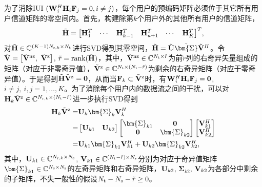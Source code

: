 为了消除IUI ${({{\bf{W}}_i^H{{\bf{H}}_i}{{\bf{F}}_j}} = 0, i \ne j)}$，每个用户的预编码矩阵必须位于其它所有用户信道矩阵的零空间内。首先，构建除第${k}$个用户外的其他所有用户的信道矩阵，
\begin{equation}\label{chap2:eq35}
  {\tilde{{\bf{H}}}} = {{\begin{bmatrix}
                       {{\bf{H}}_1^T} & \cdots & {{\bf{H}}_{k - 1}^T} & {{\bf{H}}_{u + 1}^T} & \cdots & {{\bf{H}}_K^T}
                     \end{bmatrix}}^T},
\end{equation}
对${{\tilde{{\bf{H}}}} \in {\mathbb{C}^{(K - 1){N_{{\rm{r}},k}} \times {N_{\rm{t}}}}}}$进行SVD得到其零空间，${{\tilde{{\bf{H}}}} = {\tilde{{\bf{U}}}}{\tilde{{\bm{\Sigma}}}}{{\tilde{{\bf{V}}}}^H}}$。令${{\tilde{{\bf{V}}}} = \left[{{\tilde{{\bf{V}}}}^{\rm{nz}}},~ {{\tilde{{\bf{V}}}}^{\rm{z}}} \right]}$, ${{\tilde{r}} = {\rm{rank}}({\tilde{{\bf{H}}}})}$，其中，${{{\tilde{{\bf{V}}}}^{\rm{nz}}} \in {\mathbb{C}^{{N_{\rm{t}}} \times {\tilde{r}}}}}$为前${{\tilde{r}}}$列的右奇异矢量组成的矩阵（对应于非零奇异值），${{{\tilde{{\bf{V}}}}^{\rm{z}}} \in {\mathbb{C}^{{N_{\rm{t}}} \times ({N_{\rm{t}}}-{\tilde{r}})}}}$为剩余的右奇异矩阵（对应于零奇异值）。于是得到${{\tilde{{\bf{H}}}}{{\tilde{{\bf{V}}}}^{\rm{z}}} = {\bf{0}}}$，从而当${{{\bf{F}}_k} \subset {{\tilde{{\bf{V}}}}^{\rm{z}}}}$时，有${{{\bf{W}}_i^H{{\bf{H}}_i}{{\bf{F}}_j}} = {\bf{0}}}$, ${i \ne j,~ i,j = 1,\ldots,K}$。为了消除每个用户内的数据流之间的干扰，可以对${{{\bf{H}}_k}{{\tilde{{\bf{V}}}}^{\rm{z}}} \in {\mathbb{C}^{{N_{{\rm{r}},k}} \times \left( {{N_{\rm{t}}} - {\tilde{r}}} \right)}}}$进一步执行SVD得到
\begin{align}\label{chap2:eq36}
  \nonumber {{\bf{H}}_k}{{\tilde{{\bf{V}}}}^{\rm{z}}} = & {{\bf{U}}_k}{{\bm{\Sigma }}_k}{{\bf{V}}_k^H} \\
  \nonumber  = & \begin{bmatrix}
                   {{{\bf{U}}_{k1}}} & {{{\bf{U}}_{k2}}}
                 \end{bmatrix}
                 \begin{bmatrix}
                   {{\bm{\Sigma }}_{k1}} & {\bf{0}} \\
                   {\bf{0}} & {{\bm{\Sigma }}_{k2}}
                 \end{bmatrix}
                 \begin{bmatrix}
                   {{\bf{V}}_{k1}^H} \\
                   {{\bf{V}}_{k2}^H}
                 \end{bmatrix}\\
  = & {{\bf{U}}_{k1}}{{\bm{\Sigma }}_{k1}}{{\bf{V}}_{k1}^H} + {{\bf{U}}_{k2}}{{\bm{\Sigma }}_{k2}}{{\bf{V}}_{k2}^H},
\end{align}
其中，${{{\bf{U}}_{k1}} \in {\mathbb{C}^{{N_{{\rm{r}},k}} \times {N_{\rm{s}}}}}}$, ${{{\bf{V}}_{k1}} \in {\mathbb{C}^{\left( {{N_{\rm{t}}} - {\tilde{r}}} \right) \times {N_{\rm{s}}}}}}$分别为对应于奇异值矩阵${{{\bm{\Sigma }}_{k1}} \in {\mathbb{C}^{{N_{\rm{s}}} \times {N_{\rm{s}}}}}}$的左奇异矩阵和右奇异矩阵，${{{\bf{U}}_{k2}}}$, ${{{\bm{\Sigma }}_{k2}}}$, ${{{\bf{V}}_{k2}}}$为各部分中剩余的子矩阵，不失一般性的假设${{N_{\rm{t}}}-{N_{\rm{s}}}-{\tilde{r}} \geq 0}$。

